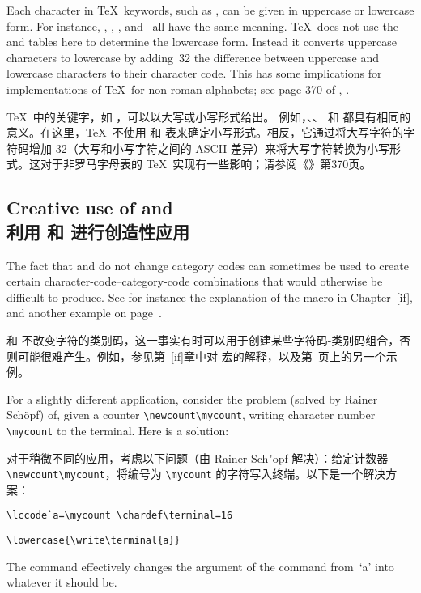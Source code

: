 Each character in \TeX\ keywords, such as , can be
given in uppercase or lowercase form. 
For instance, , , , and~ all have
the same meaning. \TeX\ does not use
the  and  tables here to
determine the lowercase form. Instead it
converts uppercase characters to lowercase by adding~32
\ldash the \ascii{} difference between uppercase and lowercase
characters \rdash to their character code. This has some implications
for implementations of \TeX\ for non-roman alphabets;
see page 370 of \TeXbook, \cite{Knuth:TeXbook}.

\TeX\ 中的关键字，如 ，可以以大写或小写形式给出。
例如，、、 和  都具有相同的意义。在这里，\TeX\ 不使用  和  表来确定小写形式。相反，它通过将大写字符的字符码增加 32（大写和小写字符之间的 ASCII 差异）来将大写字符转换为小写形式。这对于非罗马字母表的 \TeX\ 实现有一些影响；请参阅《\TeXbook》第370页\cite{Knuth:TeXbook}。

\subsection{Creative use of  and \\利用  和  进行创造性应用}

The fact that  and  do not change
category codes can sometimes be used to create certain
character-code--category-code combinations that would
otherwise be difficult to produce. See for instance the
explanation of the  macro in Chapter~\ref{if},
and another example on page~\pageref{spsb:truc}.

 和  不改变字符的类别码，这一事实有时可以用于创建某些字符码-类别码组合，否则可能很难产生。例如，参见第~\ref{if}章中对  宏的解释，以及第\pageref{spsb:truc}~页上的另一个示例。

For a slightly different application, consider the
problem (solved by Rainer Sch\"opf) of,
given a counter \verb-\newcount\mycount-, writing character
number \verb-\mycount- to the terminal.
Here is a solution:

对于稍微不同的应用，考虑以下问题（由 Rainer Sch"opf 解决）：给定计数器 \verb-\newcount\mycount-，将编号为 \verb-\mycount- 的字符写入终端。以下是一个解决方案：
\begin{verbatim}
\lccode`a=\mycount \chardef\terminal=16
\end{verbatim}
\awp
\begin{verbatim}
\lowercase{\write\terminal{a}}
\end{verbatim}
The  command effectively changes the 
argument of the  command from~`\n a'
into whatever it should be.

